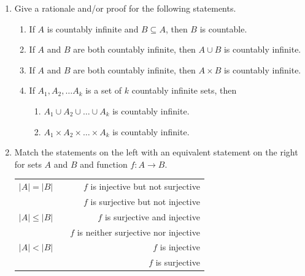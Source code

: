 \documentclass[12pt]{article}
\begin{document}
\begin{enumerate}
\item Give a rationale and/or proof for the following statements.
	\begin{enumerate}
	\item If $A$ is countably infinite and $B\subseteq A$, then $B$ is countable.
	\vfill
	\item If $A$ and $B$ are both countably infinite, then $A \cup B$ is countably infinite.
	\vfill
	\item If $A$ and $B$ are both countably infinite, then $A \times B$ is countably infinite.
	\vfill
\newpage
	\item If $A_1, A_2, \ldots A_k$ is a set of $k$ countably infinite sets, then
		\begin{enumerate}
		\item $A_1 \cup A_2 \cup \ldots \cup A_k$ is countably infinite.
		\vfill
		\item $A_1 \times A_2 \times \ldots \times A_k$ is countably infinite.
		\vfill
		\end{enumerate}
	\end{enumerate}

\item Match the statements on the left with an equivalent statement on the right for sets $A$ and $B$ and function $f:A \to B.$


\begin{tabular}{l c r}
$|A|=|B|$&\quad \quad \quad&$f$ is injective but not surjective\\
&&$f$ is surjective but not injective\\
$|A|\leq |B|$&&$f$ is surjective and injective\\
&&$f$ is neither surjective nor injective\\
$|A|< |B|$&&$f$ is injective \\
&&$f$ is surjective \\
\end{tabular}
\end{enumerate}
\end{document}
